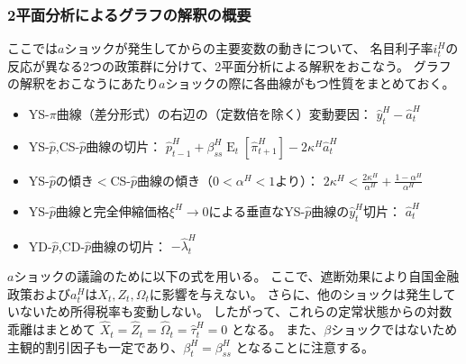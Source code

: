 
\subsubsection{2平面分析によるグラフの解釈の概要}
\label{sec:chapter5_a_shock_interpretations_overview}
ここでは\(a\)ショックが発生してからの主要変数の動きについて、
名目利子率\(i_t^H\)の反応が異なる2つの政策群に分けて、2平面分析による解釈をおこなう。
グラフの解釈をおこなうにあたり\(a\)ショックの際に各曲線がもつ性質をまとめておく。
\begin{itemize}
    \item YS-\(\pi\)曲線（差分形式）の右辺の（定数倍を除く）変動要因：
           \(\hat{y}_t^H-\hat{a}_t^H\)
    \item YS-\(\hat{p}\),CS-\(\hat{p}\)曲線の切片：
          \(\hat{p}_{t-1}^H+\beta_{ss}^H\operatorname{E}_t[\hat{\pi}_{t+1}^H]-2\kappa^H\hat{a}_t^H\)
    \item YS-\(\hat{p}\)の傾き\(<\)CS-\(\hat{p}\)曲線の傾き（\(0<\alpha^H<1\)より）：
          \(2\kappa^H<\frac{2\kappa^H}{\alpha^H}+\frac{1-\alpha^H}{\alpha^H}\) 
    \item YS-\(\hat{p}\)曲線と完全伸縮価格\(\xi^H\to0\)による垂直なYS-\(\hat{p}\)曲線の\(\hat{y}_t^H\)切片：
          \(\hat{a}_t^H\)
    \item YD-\(\hat{p}\),CD-\(\hat{p}\)曲線の切片：
          \(-\hat{\lambda}_t^H\)
\end{itemize}

\(a\)ショックの議論のために以下の式を用いる。
ここで、遮断効果により自国金融政策および\(a_t^H\)は\(X_t, Z_t, \Omega_t\)に影響を与えない。
さらに、他のショックは発生していないため所得税率も変動しない。
したがって、これらの定常状態からの対数乖離はまとめて \(\hat{X}_t=\hat{Z}_t=\hat{\Omega}_t=\hat{\tau}_t^H=0\) となる。
また、\(\beta\)ショックではないため主観的割引因子も一定であり、\(\beta_t^H=\beta_{ss}^H\) となることに注意する。

